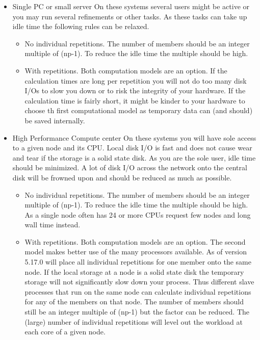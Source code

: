 \begin{itemize}
  \item Single PC or small server \newline
        On these systems several users might be active or you may run several 
        refinements or other tasks. As these tasks can take up idle time the
        following rules can be relaxed.
      \begin{itemize}
          \item No individual repetitions. The number of members should be
                an integer multiple of (np-1). To reduce the idle time the
                multiple should be high. 
          \item With repetitions. Both computation models are an option. If
                the calculation times are long per repetition you will not
                do too many disk I/Os to slow you down or to risk the integrity
                of your hardware. If the calculation time is fairly short, it
                might be kinder to your hardware to choose th first computational 
                model as temporary data can (and should) be saved internally.
      \end{itemize}
   \item High Performance Compute center \newline
         On these systems you will have sole access to a given node and its CPU.
         Local disk I/O is fast and does not cause wear and tear if the storage
         is a solid state disk. As you are the sole user, idle time should be
         minimized. A lot of disk I/O across the network onto the central disk
         will be frowned upon and should be reduced as much as possible.
      \begin{itemize}
          \item No individual repetitions. The number of members should be
                an integer multiple of (np-1). To reduce the idle time the
                multiple should be high. As a single node often has 24 or more
                CPUs request few nodes and long wall time instead.
          \item With repetitions. Both computation models are an option. The 
                second model makes better use of the many processors available.
                As of version 5.17.0 \Diffev will place all individual repetitions
                for one member onto the same node. If the local storage at a node 
                is a solid state disk the temporary storage will not significantly 
                slow down your process. Thus different slave processes that run on 
                the same node can calculate individual repetitions for any of the
                members on that node. The number of members should still be 
                an integer multiple of (np-1) but the factor can be reduced. The
                (large) number of individual repetitions will level out the workload
                at each core of a given node.
      \end{itemize}
\end{itemize}
